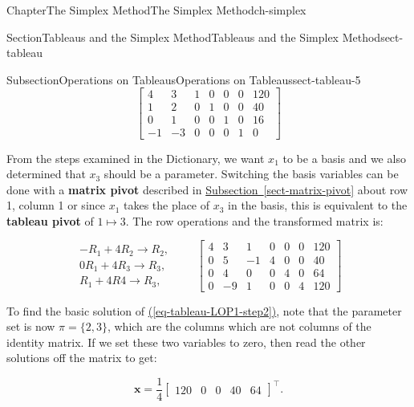 \documentclass[oneside,10pt,]{book}
\newcommand{\xreffont}{\relax}
\newcommand{\terminology}[1]{\textbf{#1}}
\numberwithin{equation}{section}
\newcommand{\amp}{&}
\begin{document}
\begin{chapterptx}{Chapter}{The Simplex Method}{}{The Simplex Method}{}{}{ch-simplex}
\begin{sectionptx}{Section}{Tableaus and the Simplex Method}{}{Tableaus and the Simplex Method}{}{}{sect-tableau}
\begin{subsectionptx}{Subsection}{Operations on Tableaus}{}{Operations on Tableaus}{}{}{sect-tableau-5}
\begin{equation}
\left[ \begin{array}{rr|rrrr|r} 4 \amp 3 \amp 1 \amp 0 \amp 0 \amp 0 \amp 120 \\ 1 \amp 2 \amp 0 \amp 1 \amp 0 \amp 0 \amp 40 \\ 0 \amp 1 \amp 0 \amp 0 \amp 1 \amp 0 \amp 16 \\ \hline -1 \amp -3 \amp 0 \amp 0 \amp 0 \amp 1 \amp 0 \end{array} \right]\label{eq-tableau-LOP1-step0}
\end{equation}
%
\par
From the steps examined in the Dictionary, we want \(x_1\) to be a basis and we also determined that \(x_3\) should be a parameter. Switching the basis variables can be done with a \terminology{matrix pivot} described in \hyperref[sect-matrix-pivot]{Subsection~{\xreffont\ref{sect-matrix-pivot}}} about row 1, column 1 or since \(x_1\) takes the place of \(x_3\) in the basis, this is equivalent to the \terminology{tableau pivot} of \(1 \mapsto 3\). The row operations and the transformed matrix is:%
\par
%
\begin{equation}
\begin{array}{r} -R_1 + 4R_2 \to R_2, \\ 0 R_1 + 4R_3 \to R_3, \\ R_1 + 4R4 \to R_3, \end{array} \qquad \left[\begin{array}{rr|rrrr|r} 4 \amp 3 \amp 1 \amp 0 \amp 0 \amp 0 \amp 120 \\ 0 \amp 5 \amp -1 \amp 4 \amp 0 \amp 0 \amp 40 \\ 0 \amp 4 \amp 0 \amp 0 \amp 4 \amp 0 \amp 64 \\ \hline 0 \amp -9 \amp 1 \amp 0 \amp 0 \amp 4 \amp 120 \end{array} \right]\label{eq-tableau-LOP1-step2}
\end{equation}
%
\par
To find the basic solution of \hyperref[eq-tableau-LOP1-step2]{({\xreffont\ref{eq-tableau-LOP1-step2}})}, note that the parameter set is now \(\pi = \{2,3\}\), which are the columns which are not columns of the identity matrix. If we set these two variables to zero, then read the other solutions off the matrix to get:%
\par
%
\begin{equation*}
\boldsymbol{x} = \frac{1}{4} \left[\begin{array}{cc|ccc} 120 \amp 0 \amp 0 \amp 40 \amp 64 \end{array}\right]^{\intercal}.

\end{equation*}
\end{subsectionptx}
\end{sectionptx}
\end{chapterptx}
\end{document}
